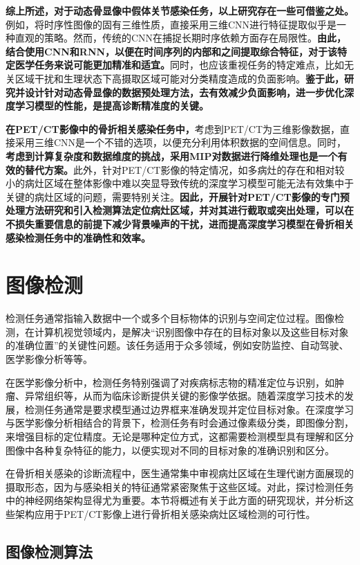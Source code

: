 \textbf{综上所述，对于动态骨显像中假体关节感染任务，以上研究存在一些可借鉴之处。}例如，将时序性图像的固有三维性质，直接采用三维CNN进行特征提取似乎是一种直观的策略。然而，传统的CNN在捕捉长期时序依赖方面存在局限性。\textbf{由此，结合使用CNN和RNN，以便在时间序列的内部和之间提取综合特征，对于该特定医学任务来说可能更加精准和适宜。}同时，也应该重视任务的特定难点，比如无关区域干扰和生理状态下高摄取区域可能对分类精度造成的负面影响。\textbf{鉴于此，研究并设计针对动态骨显像的数据预处理方法，去有效减少负面影响，进一步优化深度学习模型的性能，是提高诊断精准度的关键。}

\textbf{在PET/CT影像中的骨折相关感染任务中，}考虑到PET/CT为三维影像数据，直接采用三维CNN是一个不错的选项，以便充分利用体积数据的空间信息。同时，\textbf{考虑到计算复杂度和数据维度的挑战，采用MIP对数据进行降维处理也是一个有效的替代方案。}此外，针对PET/CT影像的特定情况，如多病灶的存在和相对较小的病灶区域在整体影像中难以突显导致传统的深度学习模型可能无法有效集中于关键的病灶区域的问题，需要特别关注。\textbf{因此，开展针对PET/CT影像的专门预处理方法研究和引入检测算法定位病灶区域，并对其进行截取或突出处理，可以在不损失重要信息的前提下减少背景噪声的干扰，进而提高深度学习模型在骨折相关感染检测任务中的准确性和效率。}

\section{图像检测}

检测任务通常指输入数据中一个或多个目标物体的识别与空间定位过程。图像检测，在计算机视觉领域内，是解决“识别图像中存在的目标对象以及这些目标对象的准确位置”的关键性问题。该任务适用于众多领域，例如安防监控、自动驾驶、医学影像分析等等。

在医学影像分析中，检测任务特别强调了对疾病标志物的精准定位与识别，如肿瘤、异常组织等，从而为临床诊断提供关键的影像学依据。随着深度学习技术的发展，检测任务通常是要求模型通过边界框来准确发现并定位目标对象。在深度学习与医学影像分析相结合的背景下，检测任务有时会通过像素级分类，即图像分割，来增强目标的定位精度。无论是哪种定位方式，这都需要检测模型具有理解和区分图像中各种复杂特征的能力，以便实现对不同的目标对象的准确识别和区分。

在骨折相关感染的诊断流程中，医生通常集中审视病灶区域在生理代谢方面展现的摄取形态，因为与感染相关的特征通常紧密聚焦于这些区域。对此，探讨检测任务中的神经网络架构显得尤为重要。本节将概述有关于此方面的研究现状，并分析这些架构应用于PET/CT影像上进行骨折相关感染病灶区域检测的可行性。

\subsection{图像检测算法}

